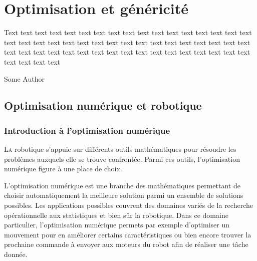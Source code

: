 \chapter[Optimisation]{Optimisation et généricité}
\label{chap:roboptim}

\epigraph{Text text text text text text text text text text text text
  text text text text text text text text text text text text text
  text text text text text text text text text text text text text
  text text text text text text text text text text text text text
  text text text text}{Some Author}
\clearpage

\section[Optimisation]{Optimisation numérique et robotique}

\subsection{Introduction à l'optimisation numérique}

\lettrine[lines=2, lraise=0.1, nindent=0em, slope=-.5em]%
{L}{a} robotique s'appuie sur différents outils mathématiques
pour résoudre les problèmes auxquels elle se trouve confrontée. Parmi
ces outils, l'optimisation numérique figure à une place de choix.


L'optimisation numérique est une branche des mathématiques permettant
de choisir automatiquement la meilleure solution parmi un ensemble de
solutions possibles. Les applications possibles couvrent des domaines
variés de la recherche opérationnelle aux statistiques et bien sûr la
robotique. Dans ce domaine particulier, l'optimisation numérique
permets par exemple d'optimiser un mouvement pour en améliorer
certains caractéristiques ou bien encore trouver la prochaine commande
à envoyer aux moteurs du robot afin de réaliser une tâche donnée.



